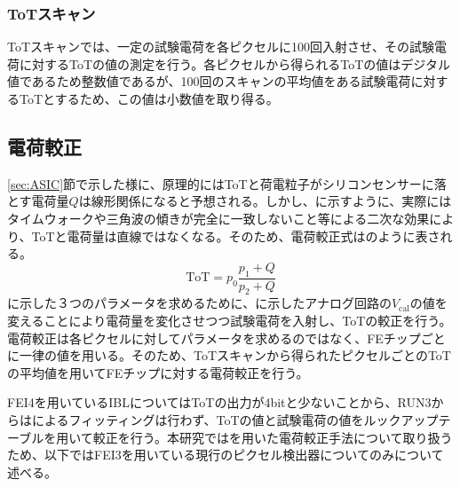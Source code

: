 \subsubsection{ToTスキャン}
\label{sec:totscan}
ToTスキャンでは、一定の試験電荷を各ピクセルに100回入射させ、その試験電荷に対するToTの値の測定を行う。各ピクセルから得られるToTの値はデジタル値であるため整数値であるが、100回のスキャンの平均値をある試験電荷に対するToTとするため、この値は小数値を取り得る。


\subsection{電荷較正}
\label{sec:calibration}
\ref{sec:ASIC}節で示した様に、原理的にはToTと荷電粒子がシリコンセンサーに落とす電荷量$Q$は線形関係になると予想される。しかし、に示すように、実際にはタイムウォークや三角波の傾きが完全に一致しないこと等による二次な効果により、ToTと電荷量は直線ではなくなる。そのため、電荷較正式はのように表される。
\begin{equation}
  \label{eq:calibration}
  \mathrm{ToT} = p_0\frac{p_1 + Q}{p_2 + Q}
\end{equation}
に示した３つのパラメータを求めるために、に示したアナログ回路の$V_\mathrm{cal}$の値を変えることにより電荷量を変化させつつ試験電荷を入射し、ToTの較正を行う。電荷較正は各ピクセルに対してパラメータを求めるのではなく、FEチップごとに一律の値を用いる。そのため、ToTスキャンから得られたピクセルごとのToTの平均値を用いてFEチップに対する電荷較正を行う。

FEI4を用いているIBLについてはToTの出力が4bitと少ないことから、RUN3からはによるフィッティングは行わず、ToTの値と試験電荷の値をルックアップテーブルを用いて較正を行う。本研究ではを用いた電荷較正手法について取り扱うため、以下ではFEI3を用いている現行のピクセル検出器についてのみについて述べる。

